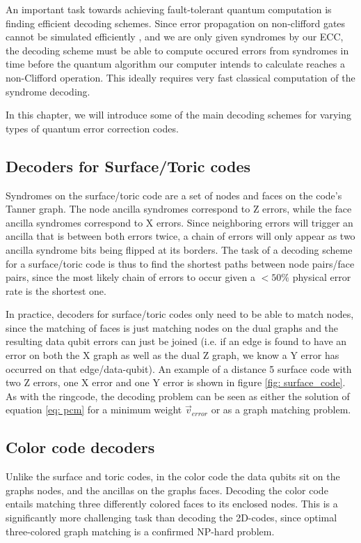 An important task towards achieving fault-tolerant quantum computation is
finding efficient decoding schemes.
Since error propagation on non-clifford gates cannot be simulated efficiently
\cite{gottesmanFaultTolerant}, and we are only given syndromes by our ECC,
the decoding scheme must be able to compute occured 
errors from syndromes in time before the quantum algorithm our computer intends 
to calculate reaches a non-Clifford operation. This ideally requires very fast 
classical computation of the syndrome decoding.

In this chapter, we will introduce some of the main decoding schemes for
varying types of quantum error correction codes.

\subsection{Decoders for Surface/Toric codes}
Syndromes on the surface/toric code are a set of nodes and
faces on the code's Tanner graph. The node ancilla syndromes correspond to
Z errors, while the face ancilla syndromes correspond to X errors.
Since neighboring errors will trigger an ancilla that is between 
both errors twice, a chain of errors will only appear as two ancilla
syndrome bits being flipped at its borders.
The task of a decoding scheme for a surface/toric code is thus to
find the shortest paths between node pairs/face pairs, since the most likely
chain of errors to occur given a $<50\%$ physical error rate is the 
shortest one.

In practice, decoders for surface/toric codes only need to be able to
match nodes, since the matching of faces is just matching nodes on the 
dual graphs and the resulting data qubit errors can just be joined
(i.e. if an edge is found to have an error on both the X graph as well as the
dual Z graph, we know a Y error has occurred on that edge/data-qubit).
An example of a distance 5 surface code with two Z errors, one X error and
one Y error is shown in figure \ref{fig: surface_code}.
As with the ringcode, the decoding problem can be seen as either the
solution of equation \ref{eq: pcm} for a minimum weight $\vec{v}_{error}$
or as a graph matching problem.



\subsection{Color code decoders}
Unlike the surface and toric codes, in the color code the 
data qubits sit on the graphs nodes, and the ancillas on the 
graphs faces. Decoding the color code entails matching 
three differently colored faces to its enclosed nodes.
This is a significantly more challenging task than
decoding the 2D-codes, since optimal three-colored graph matching 
is a confirmed NP-hard problem\cite{delfosse}.

